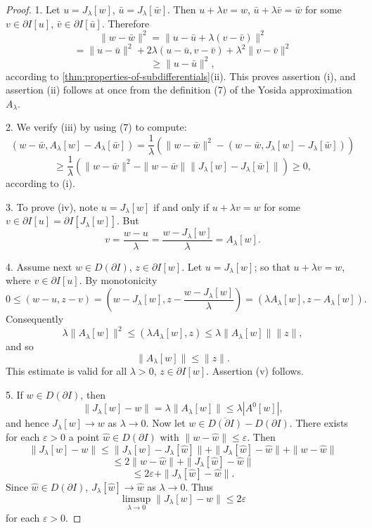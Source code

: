 \begin{proof}
1. Let $u = J_\lambda[w]$, $\bar{u} = J_\lambda[\bar{w}]$. Then $u + \lambda v = w$, $\bar{u} + \lambda \bar{v} = \bar{w}$ for some $v \in \partial I[u]$, $\bar{v} \in \partial I[\bar{u}]$. Therefore
\[
\|w - \bar{w}\|^2 = \|u - \bar{u} + \lambda(v - \bar{v})\|^2
\]
\[
= \|u - \bar{u}\|^2 + 2\lambda(u - \bar{u}, v - \bar{v}) + \lambda^2\|v - \bar{v}\|^2
\]
\[
\ge \|u - \bar{u}\|^2,
\]
according to \cref{thm:properties-of-subdifferentials}(ii). This proves assertion (i), and assertion (ii) follows at once from the definition (7) of the Yosida approximation $A_\lambda$.

2. We verify (iii) by using (7) to compute:
\[
(w - \bar{w}, A_\lambda[w] - A_\lambda[\bar{w}]) = \frac{1}{\lambda}(\|w - \bar{w}\|^2 - (w - \bar{w}, J_\lambda[w] - J_\lambda[\bar{w}]))
\]
\[
\ge \frac{1}{\lambda}(\|w - \bar{w}\|^2 - \|w - \bar{w}\| \|J_\lambda[w] - J_\lambda[\bar{w}]\|) \ge 0,
\]
according to (i).

3. To prove (iv), note $u = J_\lambda[w]$ if and only if $u + \lambda v = w$ for some $v \in \partial I[u] = \partial I[J_\lambda[w]]$. But
\[
v = \frac{w - u}{\lambda} = \frac{w - J_\lambda[w]}{\lambda} = A_\lambda[w].
\]

4. Assume next $w \in D(\partial I)$, $z \in \partial I[w]$. Let $u = J_\lambda[w]$; so that $u + \lambda v = w$, where $v \in \partial I[u]$. By monotonicity
\[
0 \le (w - u, z - v) = \left(w - J_\lambda[w], z - \frac{w - J_\lambda[w]}{\lambda}\right) = (\lambda A_\lambda[w], z - A_\lambda[w]).
\]
Consequently
\[
\lambda\|A_\lambda[w]\|^2 \le (\lambda A_\lambda[w], z) \le \lambda\|A_\lambda[w]\| \|z\|,
\]
and so
\[
\|A_\lambda[w]\| \le \|z\|.
\]
This estimate is valid for all $\lambda > 0$, $z \in \partial I[w]$. Assertion (v) follows.

5. If $w \in D(\partial I)$, then
\[
\|J_\lambda[w] - w\| = \lambda\|A_\lambda[w]\| \le \lambda|A^0[w]|,
\]
and hence $J_\lambda[w] \to w$ as $\lambda \to 0$. Now let $w \in \overline{D(\partial I)} - D(\partial I)$. There exists for each $\varepsilon > 0$ a point $\hat{w} \in D(\partial I)$ with $\|w - \hat{w}\| \le \varepsilon$. Then
\[
\|J_\lambda[w] - w\| \le \|J_\lambda[w] - J_\lambda[\hat{w}]\| + \|J_\lambda[\hat{w}] - \hat{w}\| + \|w - \hat{w}\|
\]
\[
\le 2\|w - \hat{w}\| + \|J_\lambda[\hat{w}] - \hat{w}\|
\]
\[
\le 2\varepsilon + \|J_\lambda[\hat{w}] - \hat{w}\|.
\]
Since $\hat{w} \in D(\partial I)$, $J_\lambda[\hat{w}] \to \hat{w}$ as $\lambda \to 0$. Thus
\[
\limsup_{\lambda \to 0} \|J_\lambda[w] - w\| \le 2\varepsilon
\]
for each $\varepsilon > 0$.
\end{proof}

